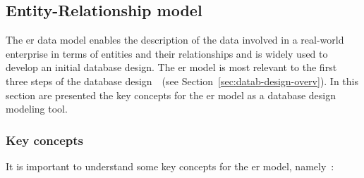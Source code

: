 \subsection{Entity-Relationship model}
\label{sec:entity-relat-model}
%
The \acrfull{er} data model enables the description of the data involved in a
real-world enterprise in terms of entities and their relationships and is widely
used to develop an initial database design. The \gls{er} model is most relevant
to the first three steps of the database
design~\cite{ramakrishnan2003database}~(see Section~\ref{sec:datab-design-overv}).
In this section are presented the
key concepts for the \gls{er} model as a database design modeling tool.
%

\subsubsection{Key concepts}
\label{sec:key-concepts}
It is important to understand some key concepts for the \gls{er} model, namely~\cite{ramakrishnan2003database}:
